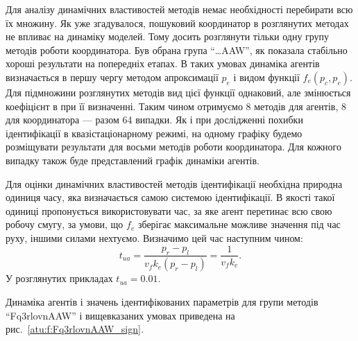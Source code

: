 Для аналізу динамічних властивостей методів немає необхідності
перебирати всю їх множину. Як уже згадувалося, пошуковий
координатор в розглянутих методах не впливає на динаміку
моделей. Тому досить розглянути тільки одну групу методів роботи
координатора. Був обрана група ``\ldots{}AAW'', як показала стабільно
хороші результати на попередніх етапах. В таких умовах динаміка
агентів визначається в першу чергу методом апроксимації
$p_e$ і видом функції
$f_e(p_c, p_e)$. Для підмножини розглянутих методів вид цієї функції
однаковий, але змінюється коефіцієнт в при її визначенні. Таким
чином отримуємо 8 методів для агентів, 8 для координатора ---
разом 64 випадки. Як і при дослідженні похибки ідентифікації в
квазістаціонарному режимі, на одному графіку будемо розміщувати
результати для восьми методів роботи координатора. Для кожного
випадку також буде представлений графік динаміки агентів.

Для оцінки динамічних властивостей методів ідентифікації необхідна природна
одиниця часу, яка визначається самою системою ідентифікації.
В якості такої
одиниці пропонується використовувати час, за яке агент перетинає всю свою
робочу смугу, за умови, що $f_e$ зберігає максимальне можливе значення під
час руху, іншими силами нехтуємо.
Визначимо цей час  наступним чином:
%
\begin{equation}
  t_{ua} = \frac{p_r - p_l}{ v_f k_e(p_r - p_l)} = \frac{1}{v_f k_e}.
  \label{atu:eq:t_ua}
\end{equation}
%
У розглянутих прикладах $t_{ua} = 0.01$.

Динаміка агентів і значень ідентифікованих параметрів для групи методів
``Fq3rlovnAAW'' і вищевказаних умовах приведена на рис.~\ref{atu:f:Fq3rlovnAAW_sign}.


